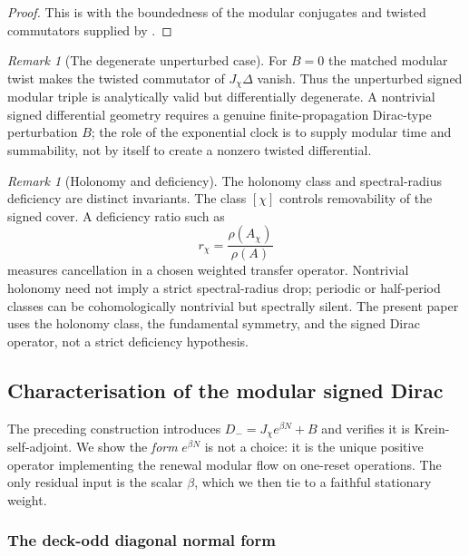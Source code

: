 \documentclass[11pt]{article}
\theoremstyle{definition}
\theoremstyle{remark}
\newtheorem{remark}[theorem]{Remark}
\newcommand{\Jchi}{J_\chi}
\begin{document}
\begin{proof}
This is  with the boundedness of the modular conjugates
and twisted commutators supplied by .
\end{proof}

\begin{remark}[The degenerate unperturbed case]
\label{rem:checkable-honest}
For $B=0$ the matched modular twist makes the twisted commutator of
$J_\chi\Delta$ vanish.  Thus the unperturbed signed modular triple is
analytically valid but differentially degenerate.  A nontrivial signed
differential geometry requires a genuine finite-propagation Dirac-type
perturbation $B$; the role of the exponential clock is to supply modular time
and summability, not by itself to create a nonzero twisted differential.
\end{remark}

\begin{remark}[Holonomy and deficiency]
\label{rem:holonomy-deficiency}
The holonomy class and spectral-radius deficiency are distinct invariants.  The
class $[\chi]$ controls removability of the signed cover.  A deficiency ratio
such as
\[
  r_\chi=\frac{\rho(A_\chi)}{\rho(A)}
\]
measures cancellation in a chosen weighted transfer operator.  Nontrivial
holonomy need not imply a strict spectral-radius drop; periodic or half-period
classes can be cohomologically nontrivial but spectrally silent.  The present
paper uses the holonomy class, the fundamental symmetry, and the signed Dirac
operator, not a strict deficiency hypothesis.
\end{remark}

\subsection{Characterisation of the modular signed Dirac}
\label{sec:cviii}

The preceding construction introduces $D_-=\Jchi e^{\beta N}+B$ and verifies it is
Krein-self-adjoint.  We show the \emph{form} $e^{\beta N}$ is not a choice: it is
the unique positive operator implementing the renewal modular flow on one-reset
operations.  The only residual input is the scalar $\beta$, which we then tie to
a faithful stationary weight.

\subsubsection{The deck-odd diagonal normal form}
\end{document}
